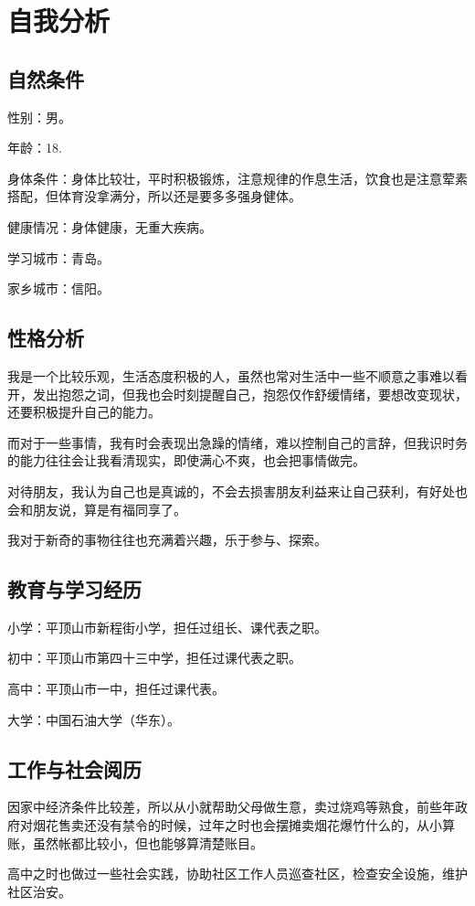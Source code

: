 \documentclass{article}
\begin{document}
\thispagestyle{empty}
\newpage
\setcounter{page}{1}
\section{自我分析}
	\par
\subsection{自然条件}
性别：男。\par
年龄：18.\par
身体条件：身体比较壮，平时积极锻炼，注意规律的作息生活，饮食也是注意荤素搭配，但体育没拿满分，所以还是要多多强身健体。\par
健康情况：身体健康，无重大疾病。\par
学习城市：青岛。\par
家乡城市：信阳。\par
\subsection{性格分析}
我是一个比较乐观，生活态度积极的人，虽然也常对生活中一些不顺意之事难以看开，发出抱怨之词，但我也会时刻提醒自己，抱怨仅作舒缓情绪，要想改变现状，还要积极提升自己的能力。\par
而对于一些事情，我有时会表现出急躁的情绪，难以控制自己的言辞，但我识时务的能力往往会让我看清现实，即使满心不爽，也会把事情做完。\par
对待朋友，我认为自己也是真诚的，不会去损害朋友利益来让自己获利，有好处也会和朋友说，算是有福同享了。\par
我对于新奇的事物往往也充满着兴趣，乐于参与、探索。\par
\subsection{教育与学习经历}
小学：平顶山市新程街小学，担任过组长、课代表之职。\par
初中：平顶山市第四十三中学，担任过课代表之职。\par
高中：平顶山市一中，担任过课代表。\par
大学：中国石油大学（华东）。\par
\subsection{工作与社会阅历}
因家中经济条件比较差，所以从小就帮助父母做生意，卖过烧鸡等熟食，前些年政府对烟花售卖还没有禁令的时候，过年之时也会摆摊卖烟花爆竹什么的，从小算账，虽然帐都比较小，但也能够算清楚账目。\par
高中之时也做过一些社会实践，协助社区工作人员巡查社区，检查安全设施，维护社区治安。\par
\end{document}
